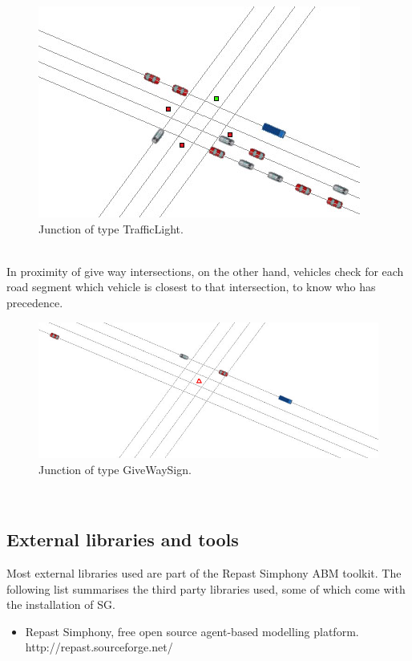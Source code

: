 \documentclass[11pt]{article}
\begin{document}
\begin{enumerate}
\begin{figure}[H]
\begin{center}
\includegraphics[scale=0.4]{traffic_light_junction}
\caption{Junction of type TrafficLight.}
\end{center}
\end{figure}

\\
In proximity of give way intersections, on the other hand, vehicles check for each road segment which vehicle is closest to that intersection, to know who has precedence.
\\
\begin{figure}[H]
\begin{center}
\includegraphics[scale=0.3]{give_way_junction}
\caption{Junction of type GiveWaySign.}
\end{center}
\end{figure}
\\

\subsection{External libraries and tools}

Most external libraries used are part of the Repast Simphony ABM toolkit.
The following list summarises the third party libraries used, some of which come with the installation of SG.
\begin{itemize}\itemsep0pt
\item Repast Simphony, free open source agent-based modelling platform.
\\
http://repast.sourceforge.net/


\end{itemize}
\end{enumerate}
\end{document}
